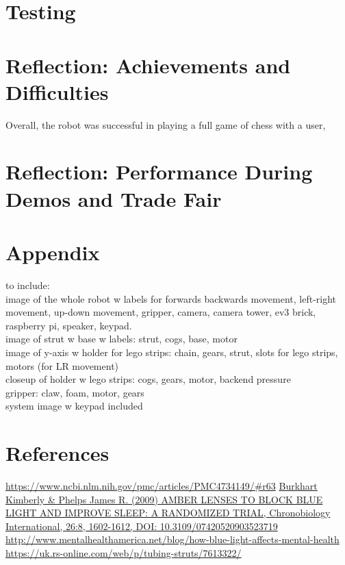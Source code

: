 \documentclass[onecolumn]{IEEEtran}
\begin{document}
\section{Testing}
\section{Reflection: Achievements and Difficulties}
Overall, the robot was successful in playing a full game of chess with a user, 
\section{Reflection: Performance During Demos and Trade Fair}
\section{Appendix}
to include:\\
image of the whole robot w labels for forwards backwards movement, left-right movement, up-down movement, gripper, camera, camera tower, ev3 brick, raspberry pi, speaker, keypad. \\
image of strut w base w labels: strut, cogs, base, motor\\
image of y-axis w holder for lego strips: chain, gears, strut, slots for lego strips, motors (for LR movement)\\
closeup of holder w lego strips: cogs, gears, motor, backend pressure\\
gripper: claw, foam, motor, gears\\
system image w keypad included \\

\section{References}
\noindent [1] \href{https://www.ncbi.nlm.nih.gov/pmc/articles/PMC4734149/\#r63}{https://www.ncbi.nlm.nih.gov/pmc/articles/PMC4734149/\#r63} \newline
[2] \href{https://www.tandfonline.com/doi/abs/10.3109/07420520903523719?casa_token=xuj5yeT4EWEAAAAA\%3ADS5C1NhfiI1XBogq05OfmNmXPNALfdGdCkl8oOSUKUsNgLJZQW5dzziJ_a5yXX3H1YCVc57m8jc\&}{Burkhart Kimberly \& Phelps James R. (2009) AMBER LENSES TO BLOCK BLUE LIGHT AND IMPROVE SLEEP: A RANDOMIZED TRIAL, Chronobiology International, 26:8, 1602-1612, DOI: 10.3109/07420520903523719} \newline
[3] \href{http://www.mentalhealthamerica.net/blog/how-blue-light-affects-mental-health}{http://www.mentalhealthamerica.net/blog/how-blue-light-affects-mental-health} \newline
[4]\href{https://uk.rs-online.com/web/p/tubing-struts/7613322/}{https://uk.rs-online.com/web/p/tubing-struts/7613322/}
\end{document}
